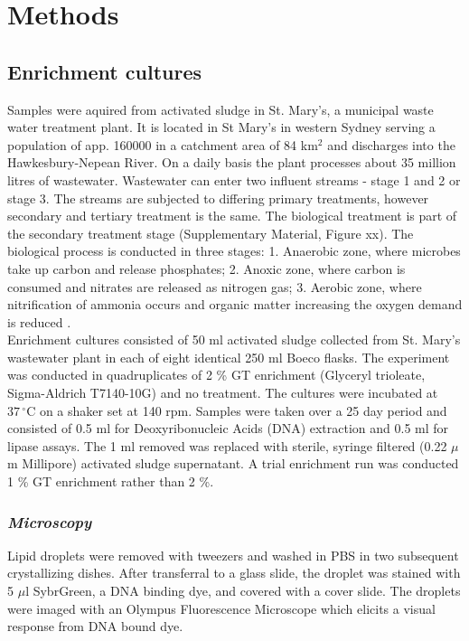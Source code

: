 \documentclass[11pt]{article}
\begin{document}
\section{Methods}
\subsection{Enrichment cultures}

Samples were aquired from activated sludge in St. Mary's, a municipal waste water treatment plant. It is located in St Mary's in western Sydney serving a population of app. 160000 in a catchment area of 84 km$^{2}$ and discharges into the Hawkesbury-Nepean River. On a daily basis the plant processes about 35 million litres of wastewater. Wastewater can enter two influent streams - stage 1 and 2 or stage 3. The streams are subjected to differing primary treatments, however secondary and tertiary treatment is the same. The biological treatment is part of the secondary treatment stage (Supplementary Material, Figure xx). The biological process is conducted in three stages: 1. Anaerobic zone, where microbes take up carbon and release phosphates; 2. Anoxic zone, where carbon is consumed and nitrates are released as nitrogen gas; 3. Aerobic zone, where nitrification of ammonia occurs and organic matter increasing the oxygen demand is reduced \cite{stmarys}.\\


Enrichment cultures consisted of 50 ml activated sludge collected from St. Mary's wastewater plant in each of eight identical 250 ml Boeco flasks. The experiment was conducted in quadruplicates of 2 \% GT enrichment (Glyceryl trioleate, Sigma-Aldrich T7140-10G) and no treatment. The cultures were incubated at $37\,^{\circ}\mathrm{C}$ on a shaker set at 140 rpm. Samples were taken over a 25 day period and consisted of 0.5 ml for Deoxyribonucleic Acids (DNA) extraction and 0.5 ml for lipase assays. The 1 ml removed was replaced with sterile, syringe filtered (0.22 $\mu$m Millipore) activated sludge supernatant. 
A trial enrichment run was conducted 1 \% GT enrichment rather than 2 \%.

\subsubsection{\emph{Microscopy}}
Lipid droplets were removed with tweezers and washed in PBS in two subsequent crystallizing dishes. After transferral to a glass slide, the droplet was stained with 5 $\mu$l SybrGreen, a DNA binding dye, and covered with a cover slide. The droplets were imaged with an Olympus Fluorescence Microscope which elicits a visual response from DNA bound dye.
\end{document}
